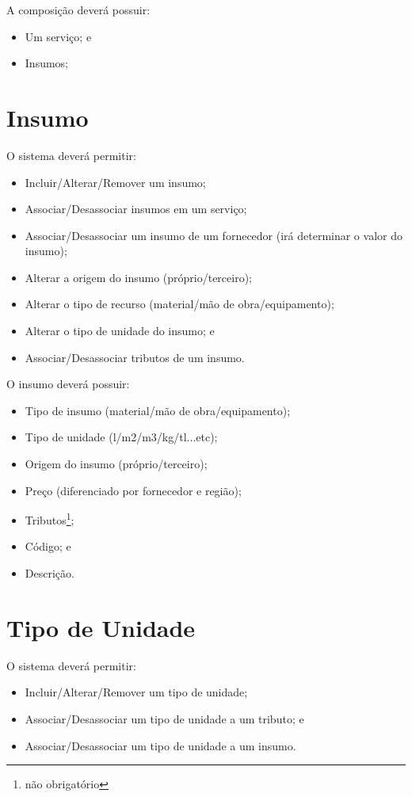 A composição deverá possuir:

\begin{itemize}
	\item Um serviço; e
	\item Insumos;
\end{itemize}

\section{Insumo}

O sistema deverá permitir:

\begin{itemize}
	\item Incluir/Alterar/Remover um insumo;
	\item Associar/Desassociar insumos em um serviço;
	\item Associar/Desassociar um insumo de um fornecedor (irá determinar o valor do insumo);
	\item Alterar a origem do insumo (próprio/terceiro);
	\item Alterar o tipo de recurso (material/mão de obra/equipamento);
	\item Alterar o tipo de unidade do insumo; e
	\item Associar/Desassociar tributos de um insumo.
\end{itemize}

O insumo deverá possuir:

\begin{itemize}
	\item Tipo de insumo (material/mão de obra/equipamento);
	\item Tipo de unidade (l/m2/m3/kg/tl...etc);
	\item Origem do insumo (próprio/terceiro);
	\item Preço (diferenciado por fornecedor e região);
	\item Tributos\footnote{não obrigatório};
	\item Código; e
	\item Descrição.
\end{itemize}

\section{Tipo de Unidade}

O sistema deverá permitir:

\begin{itemize}
	\item Incluir/Alterar/Remover um tipo de unidade;
	\item Associar/Desassociar um tipo de unidade a um tributo; e
	\item Associar/Desassociar um tipo de unidade a um insumo.
\end{itemize}

